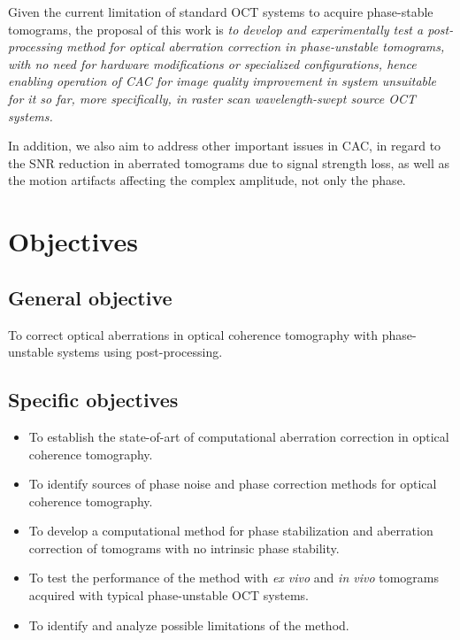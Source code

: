 Given the current limitation of standard OCT systems to acquire phase-stable tomograms, the proposal of this work is \textit{to develop and experimentally test a post-processing method for optical aberration correction in phase-unstable tomograms, with no need for hardware modifications or specialized configurations, hence enabling operation of CAC for image quality improvement in system unsuitable for it so far, more specifically, in raster scan wavelength-swept source OCT systems.}

In addition, we also aim to address other important issues in CAC, in regard to the SNR reduction in aberrated tomograms due to signal strength loss, as well as the motion artifacts affecting the complex amplitude, not only the phase.

\newpage
\section{Objectives}
\vspace{\baselineskip}
\subsection{General objective}

To correct optical aberrations in optical coherence tomography with phase-unstable systems using post-processing.

\subsection{Specific objectives}

\begin{itemize}
    \item To establish the state-of-art of computational aberration correction in optical coherence tomography.
    \item To identify sources of phase noise and phase correction methods for optical coherence tomography.
    \item To develop a computational method for phase stabilization and aberration correction of tomograms with no intrinsic phase stability.
    \item To test the performance of the method with \textit{ex vivo} and \textit{in vivo} tomograms acquired with typical phase-unstable OCT systems.
    \item To identify and analyze possible limitations of the method.
\end{itemize}

